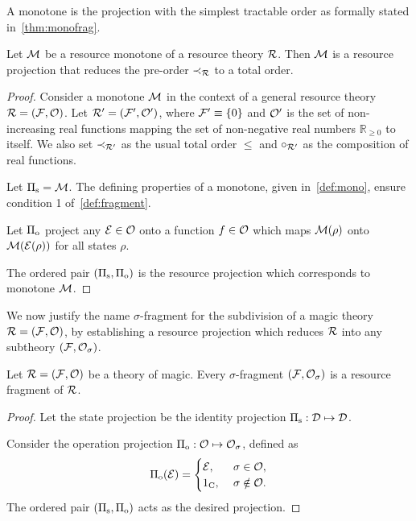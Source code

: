 \documentclass[pra,
aps,
twocolumn,
superscriptaddress,
groupedaddress,
nofootinbib,
reprint
]{revtex4-1}
\begin{document}
A monotone is the projection with the simplest tractable order as formally stated in~\cref{thm:monofrag}.
\begin{proposition}\label{thm:monofrag}
	Let $\mathcal{M}$ be a resource monotone of a resource theory $\mathcal{R}$. 
	Then $\mathcal{M}$ is a resource projection that reduces the pre-order $\prec_{\mathcal{R}}$ to a total order.
\end{proposition}
\begin{proof}
	Consider a monotone $\mathcal{M}$ in the context of a general resource theory $\mathcal{R} = (\mathcal{F}, \mathcal{O})$.
	Let $\mathcal{R}' = (\mathcal{F}', \mathcal{O}')$, where $\mathcal{F}' \equiv \{0\}$ and $\mathcal{O}'$ is the set of non-increasing real functions mapping the set of non-negative real numbers $\mathbb{R}_{\geq 0}$ to itself. 
	We also set $\prec_{\mathcal{R}'}$ as the usual total order $\leq$ and $\circ_{\mathcal{R}'}$ as the composition of real functions.
	
	Let $\Pi_{\rm{s}} = \mathcal{M}$.
	The defining properties of a monotone, given in~\cref{def:mono}, ensure condition 1 of~\cref{def:fragment}. 
	
	Let $\Pi_{\rm{o}}$ project any $\mathcal{E} \in \mathcal{O}$ onto a function $f \in \mathcal{O}$ which maps $\mathcal{M}(\rho)$ onto $\mathcal{M}(\mathcal{E}(\rho))$ for all states $\rho$.
	
	The ordered pair $(\Pi_{\rm{s}}, \Pi_{\rm{o}})$ is the resource projection which corresponds to monotone $\mathcal{M}$.
\end{proof}

We now justify the name $\sigma$-fragment for the subdivision of a magic theory $\mathcal{R} = (\mathcal{F}, \mathcal{O})$, by establishing a resource projection which reduces $\mathcal{R}$ into any subtheory $(\mathcal{F}, \mathcal{O}_\sigma)$.
\begin{proposition}
    Let $\mathcal{R} = (\mathcal{F}, \mathcal{O})$ be a theory of magic.
    Every $\sigma$-fragment $(\mathcal{F}, \mathcal{O}_\sigma)$ is a resource fragment of $\mathcal{R}$.
\end{proposition}
\begin{proof}
    Let the state projection be the identity projection $\Pi_{\rm{s}}:\mathcal{D}\mapsto\mathcal{D}$.
    
    Consider the operation projection $\Pi_{\rm{o}}:\mathcal{O} \mapsto \mathcal{O}_\sigma$, defined as
    \begin{equation}
    \Pi_{\rm{o}}(\mathcal{E}) =
    \begin{cases}
        \mathcal{E},\ &\sigma \in \mathcal{O}, \\
        1_{\rm{C}},\ &\sigma \notin \mathcal{O}.
    \end{cases}
    \end{equation}
    The ordered pair $(\Pi_{\rm{s}}, \Pi_{\rm{o}})$ acts as the desired projection.
\end{proof}
\end{document}
